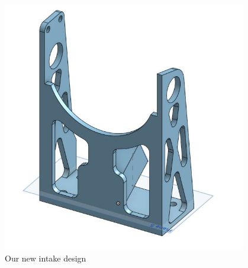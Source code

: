 \begin{figure}[htp]
\centering
\includegraphics[width=0.95\textwidth, angle=0]{Meetings/January/01-02-22/1-2-22_CAD_Figure1 - Nathan Forrer.JPG}
\caption{Our new intake design}
\label{fig:010122_1}
\end{figure}




